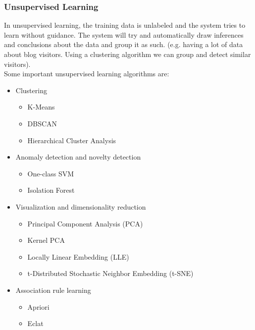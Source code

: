 \documentclass[12pt]{article}
\begin{document}
        \subsubsection{Unsupervised Learning}
            In unsupervised learning, the training data is unlabeled and the system tries to learn without guidance. The
            system will try and automatically draw inferences and conclusions about the data and group it as such. (e.g.
            having a lot of data about blog visitors. Using a clustering algorithm we can group and detect similar
            visitors). \\[0.1in]
            Some important unsupervised learning algorithms are:
            \begin{itemize}
                \item Clustering
                \begin{itemize}
                    \item K-Means
                    \item DBSCAN
                    \item Hierarchical Cluster Analysis
                \end{itemize}
                \item Anomaly detection and novelty detection
                \begin{itemize}
                    \item One-class SVM
                    \item Isolation Forest
                \end{itemize}
                \item Visualization and dimensionality reduction
                \begin{itemize}
                    \item Principal Component Analysis (PCA)
                    \item Kernel PCA
                    \item Locally Linear Embedding (LLE)
                    \item t-Distributed Stochastic Neighbor Embedding (t-SNE)
                \end{itemize}
                \item Association rule learning
                \begin{itemize}
                    \item Apriori
                    \item Eclat
                \end{itemize}
            \end{itemize}
\end{document}
